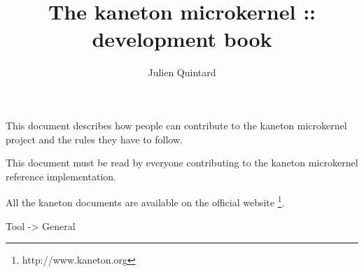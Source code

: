 %
%
%
%
%
%

%
%

\def\path{../..}

%
%



%
%

\rhead{}

%
%

\title{The kaneton microkernel :: development book
       \logos}

%
%

\author{\small{Julien Quintard}}

%
%



%
%

\maketitle

%
%

This document describes how people can contribute to the kaneton microkernel
project and the rules they have to follow.

This document must be read by everyone contributing to the kaneton microkernel
reference implementation.

All the kaneton documents are available on
the official website
  \footnote{http://www.kaneton.org}.

%
%

\tableofcontents

%
%












%
%

Tool -> General

